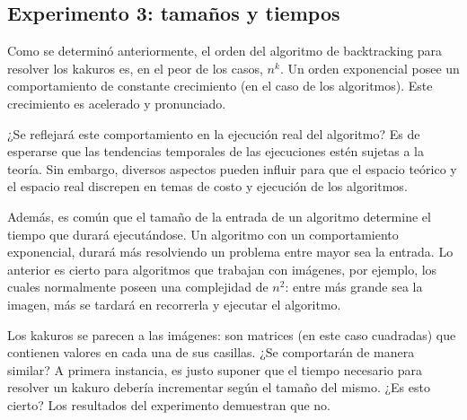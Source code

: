 \documentclass[conference]{IEEEtran}
\begin{document}




\subsection{Experimento 3: tamaños y tiempos}

    Como se determinó anteriormente, el orden del algoritmo de backtracking para resolver los kakuros es, en el peor de los casos, $n^k$. Un orden exponencial posee un comportamiento de constante crecimiento (en el caso de los algoritmos). Este crecimiento es acelerado y pronunciado.\newline
    
    ¿Se reflejará este comportamiento en la ejecución real del algoritmo? Es de esperarse que las tendencias temporales de las ejecuciones estén sujetas a la teoría. Sin embargo, diversos aspectos pueden influir para que el espacio teórico y el espacio real discrepen en temas de costo y ejecución de los algoritmos.\newline
    
    Además, es común que el tamaño de la entrada de un algoritmo determine el tiempo que durará ejecutándose. Un algoritmo con un comportamiento exponencial, durará más resolviendo un problema entre mayor sea la entrada. Lo anterior es cierto para algoritmos que trabajan con imágenes, por ejemplo, los cuales normalmente poseen una complejidad de $n^2$: entre más grande sea la imagen, más se tardará en recorrerla y ejecutar el algoritmo.\newline
    
    Los kakuros se parecen a las imágenes: son matrices (en este caso cuadradas) que contienen valores en cada una de sus casillas. ¿Se comportarán de manera similar? A primera instancia, es justo suponer que el tiempo necesario para resolver un kakuro debería incrementar según el tamaño del mismo. ¿Es esto cierto? Los resultados del experimento demuestran que no.\newline
    
\end{document}

